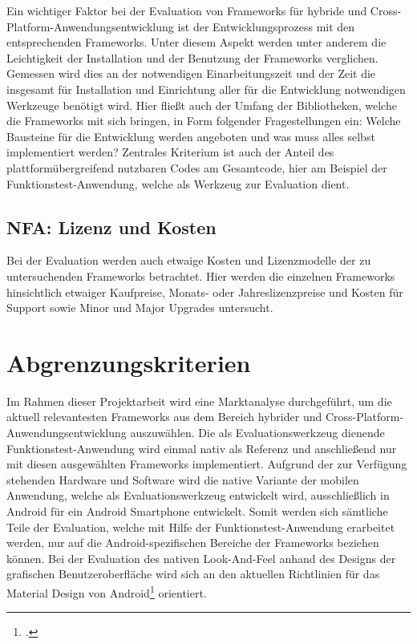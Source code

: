 Ein wichtiger Faktor bei der Evaluation von Frameworks für hybride und Cross-Platform-Anwendungsentwicklung ist der Entwicklungsprozess mit den entsprechenden Frameworks. Unter diesem Aspekt werden unter anderem die Leichtigkeit der Installation und der Benutzung der Frameworks verglichen. Gemessen wird dies an der notwendigen Einarbeitungszeit und der Zeit die insgesamt für Installation und Einrichtung aller für die Entwicklung notwendigen Werkzeuge benötigt wird. Hier fließt auch der Umfang der Bibliotheken, welche die Frameworks mit sich bringen, in Form folgender Fragestellungen ein: Welche Bausteine für die Entwicklung werden angeboten und was muss alles selbst implementiert werden? Zentrales Kriterium ist auch der Anteil des plattformübergreifend nutzbaren Codes am Gesamtcode, hier am Beispiel der Funktionstest-Anwendung, welche als Werkzeug zur Evaluation dient. 

\subsection*{NFA: Lizenz und Kosten}

Bei der Evaluation werden auch etwaige Kosten und Lizenzmodelle der zu untersuchenden Frameworks betrachtet. Hier werden die einzelnen Frameworks hinsichtlich etwaiger Kaufpreise, Monats- oder Jahreslizenzpreise und Kosten für Support sowie Minor und Major Upgrades untersucht. 

\section{Abgrenzungskriterien}

Im Rahmen dieser Projektarbeit wird eine Marktanalyse durchgeführt, um die aktuell relevantesten Frameworks aus dem Bereich hybrider und Cross-Platform-\\Anwendungsentwicklung auszuwählen. Die als Evaluationswerkzeug dienende \\Funktionstest-Anwendung wird einmal nativ als Referenz und anschließend nur mit diesen ausgewählten Frameworks implementiert. Aufgrund der zur Verfügung stehenden Hardware und Software wird die native Variante der mobilen Anwendung, welche als Evaluationswerkzeug entwickelt wird, ausschließlich in Android für ein Android Smartphone entwickelt. Somit werden sich sämtliche Teile der Evaluation, welche mit Hilfe der Funktionstest-Anwendung erarbeitet werden, nur auf die Android-spezifischen Bereiche der Frameworks beziehen können. Bei der Evaluation des nativen Look-And-Feel anhand des Designs der grafischen Benutzeroberfläche wird sich an den aktuellen Richtlinien für das Material Design von Android\footcite{MaterialDesignHP} orientiert.